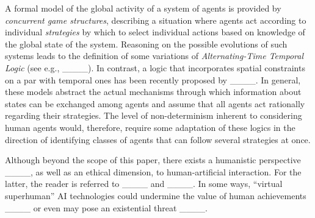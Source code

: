 A formal model of the global activity of a system of agents is provided by \textit{concurrent game structures}, describing a situation where agents act according to individual \textit{strategies} by which to select individual actions based on knowledge of the global state of the system.
Reasoning on the possible evolutions of such systems leads to the definition of some variations of \textit{Alternating-Time Temporal Logic} (see e.g., ____). In contrast, a logic that incorporates spatial constraints on a par with temporal ones has been recently proposed by ____.
In general, these models abstract the actual mechanisms through which information about states can be exchanged among agents and assume that all agents act rationally regarding their strategies. 
The level of non-determinism inherent to considering human agents would, therefore, require some adaptation of these logics in the direction of identifying classes of agents that can follow several strategies at once.

Although beyond the scope of this paper, there exists a humanistic perspective ____, as well as an ethical dimension, to 
human-artificial interaction. 
For the latter, the reader is referred to ____ and ____.
In some ways, ``virtual superhuman''  AI technologies could undermine the value of human achievements ____ or even may pose an existential threat ____.

